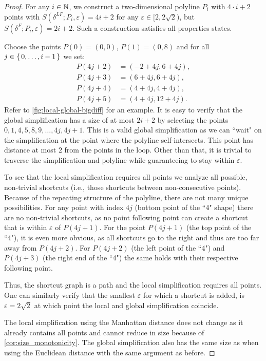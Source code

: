 \begin{proof}
	For any \(i \in \mathbb{N}\), we construct a two-dimensional polyline \(P_i\) with \(4 \cdot i + 2\) points with \(S(\delta^{LF}; P_i, \varepsilon) = 4i + 2\) for any \(\varepsilon \in [2, 2\sqrt{2})\), but \(S(\delta^F; P_i, \varepsilon) = 2i + 2\). Such a construction satisfies all properties states. 

	Choose the points \(P(0) = (0,0)\), \(P(1) = (0, 8)\) and for all \(j \in \set{0,\dots, i-1}\) we set:
	\begin{align*}
		P(4j+2) &= (-2 + 4j, 6 + 4j), \\
		P(4j+3) &= (6 + 4j, 6 + 4j), \\
		P(4j+4) &= (4 + 4j, 4 + 4j), \\
		P(4j+5) &= (4 + 4j, 12 + 4j).
	\end{align*}
	Refer to \cref{fig:local-global-bigdiff} for an example. It is easy to verify that the global simplification has a size of at most \(2i + 2\) by selecting the points \(0,1, 4, 5, 8, 9, \dots, 4j, 4j + 1\). This is a valid global simplification as we can ``wait" on the simplification at the point where the polyline self-intersects. This point has distance at most \(2\) from the points in the loop. Other than that, it is trivial to traverse the simplification and polyline while guaranteeing to stay within \(\varepsilon\). 

	To see that the local simplification requires all points we analyze all possible, non-trivial shortcuts (i.e., those shortcuts between non-consecutive points). Because of the repeating structure of the polyline, there are not many unique possibilities. For any point with index \(4j\) (bottom point of the ``4" shape) there are no non-trivial shortcuts, as no point following point can create a shortcut that is within \(\varepsilon\) of \(P(4j+1)\). For the point \(P(4j+1)\) (the top point of the ``4"), it is even more obvious, as all shortcuts go to the right and thus are too far away from \(P(4j+2)\). For \(P(4j+2)\) (the left point of the ``4") and \(P(4j+3)\) (the right end of the ``4") the same holds with their respective following point.

	Thus, the shortcut graph is a path and the local simplification requires all points. One can similarly verify that the smallest \(\varepsilon\) for which a shortcut is added, is \(\varepsilon = 2\sqrt2\) at which point the local and global simplification coincide. 

	The local simplification using the Manhattan distance does not change as it already contains all points and cannot reduce in size because of \cref{cor:size_monotonicity}. The global simplification also has the same size as when using the Euclidean distance with the same argument as before.
\end{proof}

